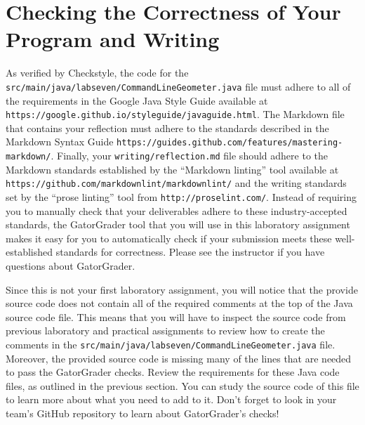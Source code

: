 \documentclass[11pt]{article}
\newcommand{\mainprogramsource}{\lstinline{src/main/java/labseven/CommandLineGeometer.java}}
\newcommand{\reflection}{\lstinline{writing/reflection.md}}
\newcommand{\url}[1]{\lstinline{#1}}
\newcommand{\step}[1]{``{#1}''}
\begin{document}
\section*{Checking the Correctness of Your Program and Writing}

As verified by Checkstyle, the code for the \mainprogramsource{} file must adhere to all of the requirements in the
Google Java Style Guide available at \url{https://google.github.io/styleguide/javaguide.html}. The Markdown file that
contains your reflection must adhere to the standards described in the Markdown Syntax Guide
\url{https://guides.github.com/features/mastering-markdown/}. Finally, your \reflection{} file should adhere to the
Markdown standards established by the \step{Markdown linting} tool available at
\url{https://github.com/markdownlint/markdownlint/} and the writing standards set by the \step{prose linting} tool from
\url{http://proselint.com/}. Instead of requiring you to manually check that your deliverables adhere to these
industry-accepted standards, the GatorGrader tool that you will use in this laboratory assignment makes it easy for you
to automatically check if your submission meets these well-established standards for correctness. Please see the
instructor if you have questions about GatorGrader.

Since this is not your first laboratory assignment, you will notice that the provide source code does not contain all of
the required comments at the top of the Java source code file. This means that you will have to inspect the source code
from previous laboratory and practical assignments to review how to create the comments in the \mainprogramsource{}
file. Moreover, the provided source code is missing many of the lines that are needed to pass the GatorGrader checks.
Review the requirements for these Java code files, as outlined in the previous section. You can study the source code of
this file to learn more about what you need to add to it. Don't forget to look in your team's GitHub repository to learn
about GatorGrader's checks!
\end{document}
